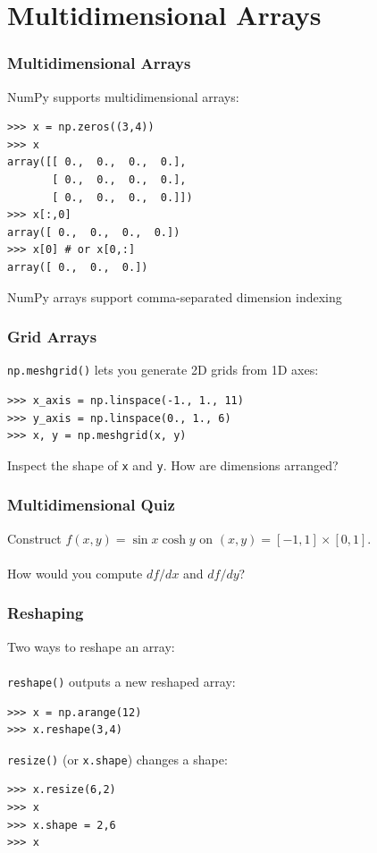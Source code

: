 \documentclass[red]{beamer}
\begin{document}
\section[Dimensions]{Multidimensional Arrays}
\begin{frame}[fragile]
    \frametitle{Multidimensional Arrays}

    NumPy supports multidimensional arrays:
    \begin{lstlisting}
>>> x = np.zeros((3,4))
>>> x
array([[ 0.,  0.,  0.,  0.],
       [ 0.,  0.,  0.,  0.],
       [ 0.,  0.,  0.,  0.]])
>>> x[:,0]
array([ 0.,  0.,  0.,  0.])
>>> x[0] # or x[0,:]
array([ 0.,  0.,  0.])
    \end{lstlisting}
    NumPy arrays support comma-separated dimension indexing

\end{frame}
\begin{frame}[fragile]
    \frametitle{Grid Arrays}

    \lstinline|np.meshgrid()| lets you generate 2D grids from 1D axes:
    \begin{lstlisting}
>>> x_axis = np.linspace(-1., 1., 11)
>>> y_axis = np.linspace(0., 1., 6)
>>> x, y = np.meshgrid(x, y)
    \end{lstlisting}
    Inspect the shape of \lstinline|x| and \lstinline|y|. How are dimensions arranged?

\end{frame}
\begin{frame}
    \frametitle{Multidimensional Quiz}

    Construct $f(x,y) = \sin x \cosh y$ on $(x,y) = [-1,1]\times[0,1]$.
    \\~\\
    How would you compute $df/dx$ and $df/dy$?
\end{frame}
\begin{frame}[fragile]
    \frametitle{Reshaping}
    Two ways to reshape an array:
    \\~\\
    \lstinline|reshape()| outputs a new reshaped array:
    \begin{lstlisting}
>>> x = np.arange(12)
>>> x.reshape(3,4)
    \end{lstlisting}
    
    \lstinline|resize()| (or \lstinline|x.shape|) changes a shape:
    \begin{lstlisting}
>>> x.resize(6,2)
>>> x
>>> x.shape = 2,6
>>> x
    \end{lstlisting}
\end{frame}
\end{document}
